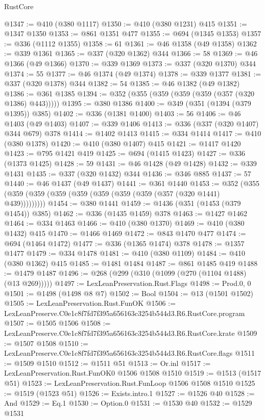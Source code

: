 \begin{lexlean}{RustCore}
\begin{coremodule}
@1347 := @410 (@380 @1117)
@1350 := @410 (@380 @1231) @415
@1351 := @1347 @1350
@1353 := @861 @1351 @477
@1355 := @694 (@1345 @1353)
@1357 := @336 (@1112 @1355)
@1358 := 61
@1361 := @46 @1358 (@49 @1358)
@1362 := @339 @1361
@1365 := @337 (@320 @1362) @344
@1366 := 58
@1369 := @46 @1366 (@49 @1366)
@1370 := @339 @1369
@1373 := @337 (@320 @1370) @344
@1374 := 55
@1377 := @46 @1374 (@49 @1374)
@1378 := @339 @1377
@1381 := @337 (@320 @1378) @344
@1382 := 54
@1385 := @46 @1382 (@49 @1382)
@1386 := @361 @1385
@1394 := @352 (@355 (@359 (@359 (@359 (@357 (@320 @1386) @443)))))
@1395 := @380 @1386
@1400 := @349 (@351 (@1394 (@379 @1395)) @385)
@1402 := @336 (@1381 @1400)
@1403 := 56
@1406 := @46 @1403 (@49 @1403)
@1407 := @339 @1406
@1413 := @336 (@337 (@320 @1407) @344 @679) @378
@1414 := @1402 @1413
@1415 := @334 @1414
@1417 := @410 (@380 @1378)
@1420 := @410 (@380 @1407) @415
@1421 := @1417 @1420
@1423 := @795 @1421 @419
@1425 := @694 (@1415 @1423)
@1427 := @336 (@1373 @1425)
@1428 := 59
@1431 := @46 @1428 (@49 @1428)
@1432 := @339 @1431
@1435 := @337 (@320 @1432) @344
@1436 := @346 @885
@1437 := 57
@1440 := @46 @1437 (@49 @1437)
@1441 := @361 @1440
@1453 := @352 (@355 (@359 (@359 (@359 (@359 (@359 (@359 (@359 (@357 (@320 @1441) @439)))))))))
@1454 := @380 @1441
@1459 := @1436 (@351 (@1453 (@379 @1454)) @385)
@1462 := @336 (@1435 @1459) @378
@1463 := @1427 @1462
@1464 := @334 @1463
@1466 := @410 (@380 @1370)
@1469 := @410 (@380 @1432) @415
@1470 := @1466 @1469
@1472 := @843 @1470 @477
@1474 := @694 (@1464 @1472)
@1477 := @336 (@1365 @1474) @378
@1478 := @1357 @1477
@1479 := @334 @1478
@1481 := @410 (@380 @1109)
@1484 := @410 (@380 @1362) @415
@1485 := @1481 @1484
@1487 := @861 @1485 @419
@1488 := @1479 @1487
@1496 := @268 (@299 (@310 (@1099 (@270 (@1104 @1488) (@13 @269)))))
@1497 := LexLeanPreservation.Rust.Flags
@1498 := Prod.{0, 0}
@1501 := @1498 (@1498 @8 @7)
@1502 := Bool
@1504 := @13 (@1501 @1502)
@1505 := LexLeanPreservation.Rust.FunOK
@1506 := LexLeanPreserve.C0e1c8f7fd7f395a656163c3254b544d3.R6.RustCore.program
@1507 := @1505 @1506
@1508 := LexLeanPreserve.C0e1c8f7fd7f395a656163c3254b544d3.R6.RustCore.krate
@1509 := @1507 @1508
@1510 := LexLeanPreserve.C0e1c8f7fd7f395a656163c3254b544d3.R6.RustCore.flags
@1511 := @1509 @1510
@1512 := @1511 @51
@1513 := Or.inl
@1517 := LexLeanPreservation.Rust.FunOK0 @1506 @1508 @1510
@1519 := @1513 (@1517 @51)
@1523 := LexLeanPreservation.Rust.FunLoop @1506 @1508 @1510
@1525 := @1519 (@1523 @51)
@1526 := Exists.intro.{1}
@1527 := @1526 @40
@1528 := And
@1529 := Eq.{1}
@1530 := Option.{0}
@1531 := @1530 @40
@1532 := @1529 @1531

\end{coremodule}
\end{lexlean}
